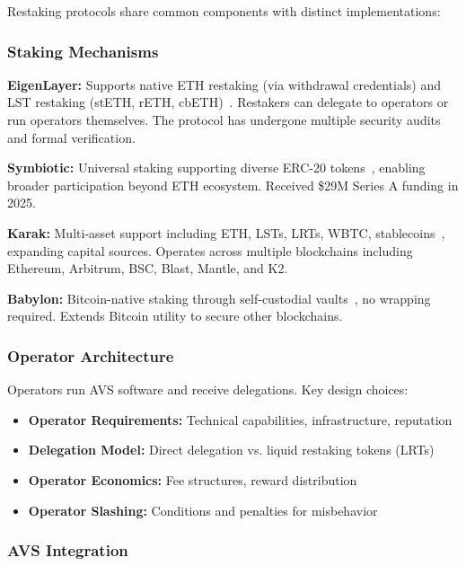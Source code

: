 \documentclass[runningheads]{llncs}
\begin{document}
Restaking protocols share common components with distinct implementations:

\subsubsection{Staking Mechanisms}

\textbf{EigenLayer:} Supports native ETH restaking (via withdrawal credentials) and LST restaking (stETH, rETH, cbETH)~\cite{eigenlayer2024,eigenlayerwhitepaper2023}. Restakers can delegate to operators or run operators themselves. The protocol has undergone multiple security audits~\cite{certora2025,code4rena2023} and formal verification.

\textbf{Symbiotic:} Universal staking supporting diverse ERC-20 tokens~\cite{symbiotic2024,symbioticwhitepaper2024}, enabling broader participation beyond ETH ecosystem. Received \$29M Series A funding in 2025.

\textbf{Karak:} Multi-asset support including ETH, LSTs, LRTs, WBTC, stablecoins~\cite{karak2024}, expanding capital sources. Operates across multiple blockchains including Ethereum, Arbitrum, BSC, Blast, Mantle, and K2.

\textbf{Babylon:} Bitcoin-native staking through self-custodial vaults~\cite{babylon2024}, no wrapping required. Extends Bitcoin utility to secure other blockchains.

\subsubsection{Operator Architecture}

Operators run AVS software and receive delegations. Key design choices:
\begin{itemize}
    \item \textbf{Operator Requirements:} Technical capabilities, infrastructure, reputation
    \item \textbf{Delegation Model:} Direct delegation vs. liquid restaking tokens (LRTs)
    \item \textbf{Operator Economics:} Fee structures, reward distribution
    \item \textbf{Operator Slashing:} Conditions and penalties for misbehavior
\end{itemize}

\subsubsection{AVS Integration}
\end{document}
